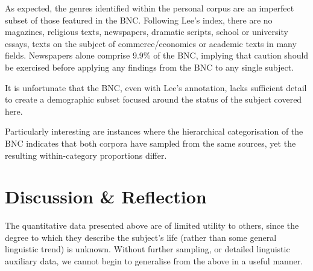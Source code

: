 
As expected, the genres identified within the personal corpus are an imperfect subset of those featured in the BNC.  Following Lee's index, there are no magazines, religious texts, newspapers, dramatic scripts, school or university essays, texts on the subject of commerce/economics or academic texts in many fields.  Newspapers alone comprise 9.9\% of the BNC, implying that caution should be exercised before applying any findings from the BNC to any single subject. %

It is unfortunate that the BNC, even with Lee's annotation, lacks sufficient detail to create a demographic subset focused around the status of the subject covered here.


Particularly interesting are instances where the hierarchical categorisation of the BNC indicates that both corpora have sampled from the same sources, yet the resulting within-category proportions differ.  











% 
% 
% 
% 
% 
% 






\section{Discussion \& Reflection}
The quantitative data presented above are of limited utility to others, since the degree to which they describe the subject's life (rather than some general linguistic trend) is unknown.  Without further sampling, or detailed linguistic auxiliary data, we cannot begin to generalise from the above in a useful manner.

